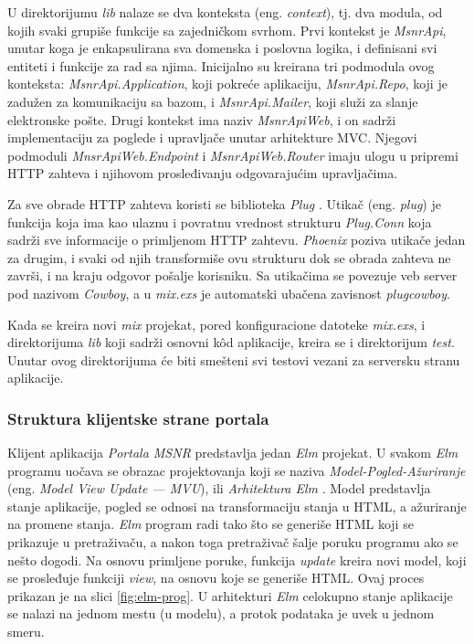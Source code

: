 \documentclass[12pt,oneside]{memoir}
\begin{document}
\par U direktorijumu \emph{lib} nalaze se dva konteksta (eng. \emph{context}), tj. dva modula, od kojih svaki grupiše funkcije sa zajedničkom svrhom. Prvi kontekst je \emph{MsnrApi}, unutar koga je enkapsulirana sva domenska i poslovna logika, i definisani svi entiteti i funkcije za rad sa njima. Inicijalno su kreirana tri podmodula ovog konteksta: \emph{MsnrApi.Application}, koji pokreće aplikaciju, \emph{MsnrApi.Repo}, koji je zadužen za komunikaciju sa bazom, i \emph{MsnrApi.Mailer}, koji služi za slanje elektronske pošte. Drugi kontekst ima naziv \emph{MsnrApiWeb}, i on sadrži implementaciju za poglede i upravljače unutar arhitekture MVC. Njegovi podmoduli \emph{MnsrApiWeb.Endpoint} i \emph{MsnrApiWeb.Router} imaju ulogu u pripremi HTTP zahteva i njihovom prosleđivanju odgovarajućim upravljačima. 
\par Za sve obrade HTTP zahteva koristi se biblioteka \emph{Plug} \cite{plug}. Utikač (eng. \emph{plug}) je funkcija koja ima kao ulaznu i povratnu vrednost strukturu \emph{Plug.Conn} koja sadrži sve informacije o primljenom HTTP zahtevu. \emph{Phoenix} poziva utikače jedan za drugim, i svaki od njih transformiše ovu strukturu dok se obrada zahteva ne završi, i na kraju odgovor pošalje korisniku. Sa utikačima se povezuje veb server pod nazivom \emph{Cowboy}, a u \emph{mix.exs} je automatski ubačena zavisnost \emph{plug{\textunderscore}cowboy}.
\par Kada se kreira novi \emph{mix} projekat, pored konfiguracione datoteke \emph{mix.exs}, i direktorijuma \emph{lib} koji sadrži osnovni k\^{o}d aplikacije, kreira se i direktorijum \emph{test}. Unutar ovog direktorijuma će biti smešteni svi testovi vezani za serversku stranu aplikacije. 

\subsubsection{Struktura klijentske strane portala}
\par Klijent aplikacija \emph{Portala MSNR} predstavlja jedan \emph{Elm} projekat. U svakom \emph{Elm} programu uočava se obrazac projektovanja koji se naziva \emph{Model-Pogled-Ažuriranje} (eng. \emph{Model View Update --- MVU}), ili \emph{Arhitektura Elm} \cite{elm-in-action}. Model predstavlja stanje aplikacije, pogled se odnosi na transformaciju stanja u HTML, a ažuriranje na promene stanja. \emph{Elm} program radi tako što se generiše HTML koji se prikazuje u pretraživaču, a nakon toga pretraživač šalje poruku programu ako se nešto dogodi. Na osnovu primljene poruke, funkcija \emph{update} kreira novi model, koji se prosleđuje funkciji \emph{view}, na osnovu koje se generiše HTML. Ovaj proces prikazan je na slici \ref{fig:elm-prog}. U arhitekturi \emph{Elm} celokupno stanje aplikacije se nalazi na jednom mestu (u modelu), a protok podataka je uvek u jednom smeru.
\end{document}
